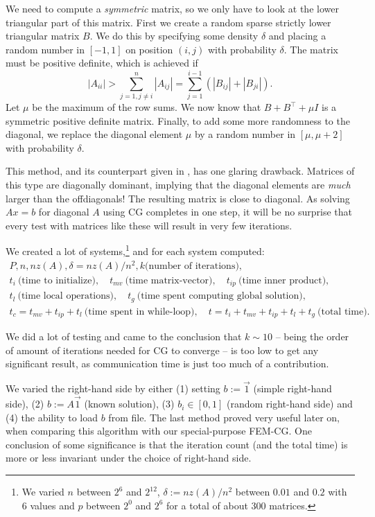 \documentclass[11pt]{amsart}
\theoremstyle{definition}
\begin{document}
We need to compute a \emph{symmetric} matrix, so we only have to look at the lower triangular part of this matrix. First we create a random sparse strictly lower triangular matrix $B$. We do this by specifying some density $\delta$ and placing a random number in $[-1,1]$ on position $(i,j)$ with probability $\delta$. The matrix must be positive definite, which is achieved \cite[Ex.~24.2]{trefbau} if
\[
  |A_{ii}| > \sum_{j=1, j\ne i}^n |A_{ij}|= \sum_{j=1}^{i-1} (|B_{ij}| + |B_{ji}|).
\]
Let $\mu$ be the maximum of the row sums. We now know that $B + B^\top + \mu I$ is a symmetric positive definite matrix. Finally, to add some more randomness to the diagonal, we replace the diagonal element $\mu$ by a random number in $[\mu, \mu + 2]$ with probability $\delta$.

This method, and its counterpart given in \cite[Ex.~4.6]{biss04}, has one glaring drawback. Matrices of this type are diagonally dominant, implying that the diagonal elements are \emph{much} larger than the offdiagonals! The resulting matrix is close to diagonal. As solving $Ax=b$ for diagonal $A$ using CG completes in one step, it will be no surprise that every test with matrices like these will result in very few iterations.

We created a lot of systems,\footnote{We varied $n$ between $2^6$ and $2^{12}$, $\delta := nz(A)/n^2$ between $0.01$ and $0.2$ with 6 values and $p$ between $2^0$ and $2^6$ for a total of about 300 matrices. } and for each system computed:
\begin{gather*} 
P, n, nz(A), \delta = nz(A)/n^2, k \text{(number of iterations)}, \\
t_i~ \text{(time to initialize)}, \quad t_{mv}~ \text{(time matrix-vector)}, \quad t_{ip}~ \text{(time inner product)}, \\
t_l~ \text{(time local operations)}, \quad t_g~ \text{(time spent computing global solution)}, \\
t_c = t_{mv} + t_{ip} + t_l~ \text{(time spent in while-loop)}, \quad t = t_i + t_{mv} + t_{ip} + t_l + t_g~ \text{(total time)}.
\end{gather*}

We did a lot of testing and came to the conclusion that $k\sim 10$ -- being the order of amount of iterations needed for CG to converge --  is too low to get any significant result, as communication time is just too much of a contribution. 

We varied the right-hand side by either (1) setting $b := \vec 1$ (simple right-hand side), (2) $b := A\vec 1$ (known solution), (3) $b_i \in [0, 1]$ (random right-hand side) and (4) the ability to load $b$ from file. The last method proved very useful later on, when comparing this algorithm with our special-purpose FEM-CG. One conclusion of some significance is that the iteration count (and the total time) is more or less invariant under the choice of right-hand side.
\end{document}

